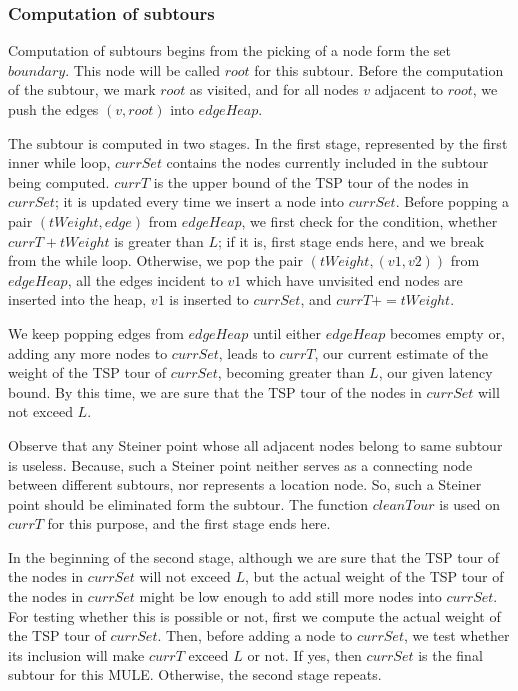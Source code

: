 \subsubsection{Computation of subtours}

Computation of subtours begins from the picking of a node form the set $boundary$. This node will be called $root$ for this subtour. Before the computation of the subtour, we mark $root$ as visited, and for all nodes $v$ adjacent to $root$, we push the edges $(v,root)$ into $edgeHeap$.

The subtour is computed in two stages. In the first stage, represented by the first inner while loop, $currSet$ contains the nodes currently included in the subtour being computed. $currT$ is the upper bound of the TSP tour of the nodes in $currSet$; it is updated every time we insert a node into $currSet$. Before popping a pair $(tWeight,edge)$ from $edgeHeap$, we first check for the condition, whether $currT+tWeight$ is greater than $L$; if it is, first stage ends here, and we break from the while loop. Otherwise, we pop the pair $(tWeight,(v1,v2))$ from $edgeHeap$, all the edges incident to $v1$ which have unvisited end nodes are inserted into the heap, $v1$ is inserted to $currSet$, and $currT+=tWeight$.

We keep popping edges from $edgeHeap$ until either $edgeHeap$ becomes empty or, adding any more nodes to $currSet$, leads to $currT$, our current estimate of the weight of the TSP tour of $currSet$, becoming greater than $L$, our given latency bound.  By this time, we are sure that the TSP tour of the nodes in $currSet$ will not exceed $L$.

Observe that any Steiner point whose all adjacent nodes belong to same subtour is useless. Because, such a Steiner point neither serves as a connecting node between different subtours, nor represents a location node. So, such a Steiner point should be eliminated form the subtour. The function $cleanTour$ is used on $currT$ for this purpose, and the first stage ends here.

In the beginning of the second stage, although we are sure that the TSP tour of the nodes in $currSet$ will not exceed $L$, but the actual weight of the TSP tour of the nodes in $currSet$ might be low enough to add still more nodes into $currSet$. For testing whether this is possible or not, first we compute the actual weight of the TSP tour of $currSet$. Then, before adding a node to $currSet$, we test whether its inclusion will make $currT$ exceed $L$ or not. If yes, then $currSet$ is the final subtour for this MULE. Otherwise, the second stage repeats. %

